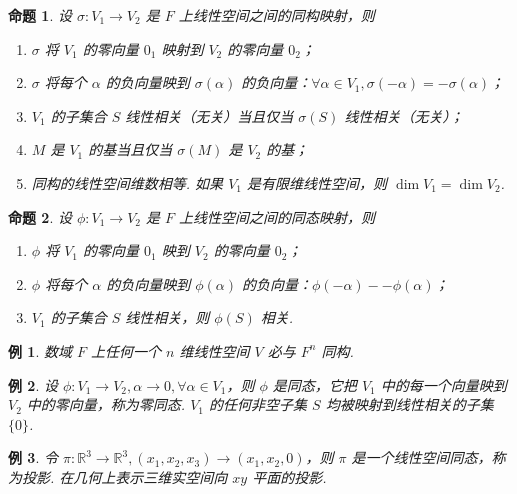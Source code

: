 \documentclass[zihao=-4,UTF8,linespread=1.8,nothm]{aytony_base}
\newtheorem{proposition}{\indent 命题}[subsection]
\newtheorem{example}{\indent 例}[subsection]
\begin{document}
\begin{proposition}
    设 $\sigma:V_1 \to V_2$ 是 $F$ 上线性空间之间的同构映射，则
    \begin{enumerate}[nosep]
        \item $\sigma$ 将 $V_1$ 的零向量 $0_1$ 映射到 $V_2$ 的零向量 $0_2$；
        \item $\sigma$ 将每个 $\alpha$ 的负向量映到 $\sigma(\alpha)$ 的负向量：$\forall \alpha \in V_1, \sigma(-\alpha) = -\sigma(\alpha)$；
        \item $V_1$ 的子集合 $S$ 线性相关（无关）当且仅当 $\sigma(S)$ 线性相关（无关）；
        \item $M$ 是 $V_1$ 的基当且仅当 $\sigma(M)$ 是 $V_2$ 的基；
        \item 同构的线性空间维数相等. 如果 $V_1$ 是有限维线性空间，则 $\dim V_1 = \dim V_2$.
    \end{enumerate}
\end{proposition}

\begin{proposition}
    设 $\phi:V_1 \to V_2$ 是 $F$ 上线性空间之间的同态映射，则
    \begin{enumerate}[nosep]
        \item $\phi$ 将 $V_1$ 的零向量 $0_1$ 映到 $V_2$ 的零向量 $0_2$；
        \item $\phi $ 将每个 $\alpha$ 的负向量映到 $\phi(\alpha)$ 的负向量：$\phi(-\alpha) - -\phi(\alpha)$；
        \item $V_1$ 的子集合 $S$ 线性相关，则 $\phi(S)$ 相关.
    \end{enumerate}
\end{proposition}

\begin{example}
    数域 $F$ 上任何一个 $n$ 维线性空间 $V$ 必与 $F^n$ 同构.
\end{example}

\setcounter{example}{3}

\begin{example}
    设 $\phi:V_1 \to V_2, \alpha \to 0, \forall \alpha \in V_1$，则 $\phi$ 是同态，它把 $V_1$ 中的每一个向量映到 $V_2$ 中的零向量，称为零同态. $V_1$ 的任何非空子集 $S$ 均被映射到线性相关的子集 $\{0\}$.
\end{example}

\begin{example}
    令 $\pi:\mathbb{R}^3 \to \mathbb{R}^3, (x_1, x_2, x_3) \to (x_1, x_2, 0)$，则 $\pi$ 是一个线性空间同态，称为投影. 在几何上表示三维实空间向 $xy$ 平面的投影.
\end{example}
\end{document}
